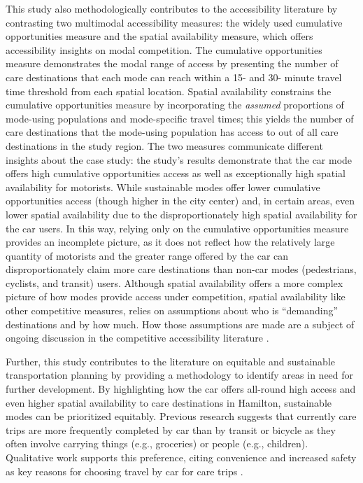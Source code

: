 \documentclass[
  authoryear,
  preprint,
  3p]{elsarticle}
\begin{document}
This study also methodologically contributes to the accessibility
literature by contrasting two multimodal accessibility measures: the
widely used cumulative opportunities measure and the spatial
availability measure, which offers accessibility insights on modal
competition. The cumulative opportunities measure demonstrates the modal
range of access by presenting the number of care destinations that each
mode can reach within a 15- and 30- minute travel time threshold from
each spatial location. Spatial availability constrains the cumulative
opportunities measure by incorporating the \emph{assumed} proportions of
mode-using populations and mode-specific travel times; this yields the
number of care destinations that the mode-using population has access to
out of all care destinations in the study region. The two measures
communicate different insights about the case study: the study's results
demonstrate that the car mode offers high cumulative opportunities
access as well as exceptionally high spatial availability for motorists.
While sustainable modes offer lower cumulative opportunities access
(though higher in the city center) and, in certain areas, even lower
spatial availability due to the disproportionately high spatial
availability for the car users. In this way, relying only on the
cumulative opportunities measure provides an incomplete picture, as it
does not reflect how the relatively large quantity of motorists and the
greater range offered by the car can disproportionately claim more care
destinations than non-car modes (pedestrians, cyclists, and transit)
users. Although spatial availability offers a more complex picture of
how modes provide access under competition, spatial availability like
other competitive measures, relies on assumptions about who is
``demanding'' destinations and by how much. How those assumptions are
made are a subject of ongoing discussion in the competitive
accessibility literature
\citep{merlinDoesCompetitionMatter2017, kelobonyeMeasuringAccessibilitySpatial2020}.

Further, this study contributes to the literature on equitable and
sustainable transportation planning by providing a methodology to
identify areas in need for further development. By highlighting how the
car offers all-round high access and even higher spatial availability to
care destinations in Hamilton, sustainable modes can be prioritized
equitably. Previous research suggests that currently care trips are more
frequently completed by car than by transit or bicycle
\citep{ravensbergenExploratoryAnalysisMobility2022} as they often
involve carrying things (e.g., groceries) or people (e.g., children).
Qualitative work supports this preference, citing convenience and
increased safety as key reasons for choosing travel by car for care
trips
\citep{maciejewskaHaveChildrenThus2019, carverParentalChauffeursWhat2013}.
\end{document}

